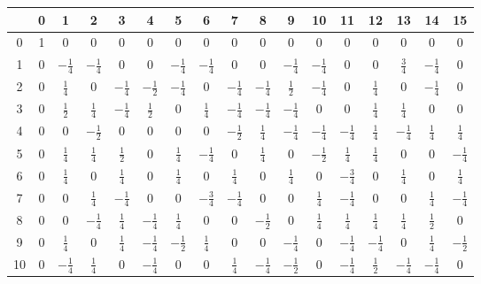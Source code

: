 \begin{refsegment}
\begin{table}
\begin{center}
\begin{tabular}{|c|cccccccccccccccc|} \hline
     & 0 & 1 & 2 & 3 & 4 & 5 & 6 & 7 & 8 & 9 &10 &11 &12 &13 &14 &15 \\ \hline
   0 & 1 & 0 & 0 & 0 & 0 & 0 & 0 & 0 & 0 & 0 & 0 & 0 & 0 & 0 & 0 & 0 \\
   1 & 0 &$-\frac{1}{4}$&$-\frac{1}{4}$& 0 & 0 &$-\frac{1}{4}$&$-\frac{1}{4}$& 0 & 0 &$-\frac{1}{4}$&$-\frac{1}{4}$& 0 & 0 &$\frac{3}{4}$&$-\frac{1}{4}$& 0 \\
   2 & 0 &$\frac{1}{4}$& 0 & $-\frac{1}{4}$ &$-\frac{1}{2}$& $-\frac{1}{4}$ & 0 & $-\frac{1}{4}$ & $-\frac{1}{4}$ &$\frac{1}{2}$& $-\frac{1}{4}$ & 0 &$\frac{1}{4}$& 0 & $-\frac{1}{4}$ & 0 \\
   3 & 0 &$\frac{1}{2}$&$\frac{1}{4}$& $-\frac{1}{4}$ &$\frac{1}{2}$& 0 &$\frac{1}{4}$& $-\frac{1}{4}$ & $-\frac{1}{4}$ & $-\frac{1}{4}$ & 0 & 0 &$\frac{1}{4}$&$\frac{1}{4}$& 0 & 0 \\
   4 & 0 & 0 &$-\frac{1}{2}$& 0 & 0 & 0 & 0 &$-\frac{1}{2}$&$\frac{1}{4}$& $-\frac{1}{4}$ & $-\frac{1}{4}$ & $-\frac{1}{4}$ &$\frac{1}{4}$& $-\frac{1}{4}$ &$\frac{1}{4}$&$\frac{1}{4}$\\
   5 & 0 &$\frac{1}{4}$&$\frac{1}{4}$&$\frac{1}{2}$& 0 &$\frac{1}{4}$& $-\frac{1}{4}$ & 0 &$\frac{1}{4}$& 0 &$-\frac{1}{2}$&$\frac{1}{4}$&$\frac{1}{4}$& 0 & 0 & $-\frac{1}{4}$ \\
   6 & 0 &$\frac{1}{4}$& 0 &$\frac{1}{4}$& 0 &$\frac{1}{4}$& 0 &$\frac{1}{4}$& 0 &$\frac{1}{4}$& 0 & $-\frac{3}{4}$ & 0 &$\frac{1}{4}$& 0 &$\frac{1}{4}$\\
   7 & 0 & 0 &$\frac{1}{4}$& $-\frac{1}{4}$ & 0 & 0 & $-\frac{3}{4}$ & $-\frac{1}{4}$ & 0 & 0 &$\frac{1}{4}$& $-\frac{1}{4}$ & 0 & 0 &$\frac{1}{4}$& $-\frac{1}{4}$ \\
   8 & 0 & 0 & $-\frac{1}{4}$ &$\frac{1}{4}$& $-\frac{1}{4}$ &$\frac{1}{4}$& 0 & 0 &$-\frac{1}{2}$& 0 &$\frac{1}{4}$&$\frac{1}{4}$&$\frac{1}{4}$&$\frac{1}{4}$&$\frac{1}{2}$& 0 \\
   9 & 0 &$\frac{1}{4}$& 0 &$\frac{1}{4}$& $-\frac{1}{4}$ &$-\frac{1}{2}$&$\frac{1}{4}$& 0 & 0 & $-\frac{1}{4}$ & 0 & $-\frac{1}{4}$ & $-\frac{1}{4}$ & 0 &$\frac{1}{4}$&$-\frac{1}{2}$\\
  10 & 0 & $-\frac{1}{4}$ &$\frac{1}{4}$& 0 & $-\frac{1}{4}$ & 0 & 0 &$\frac{1}{4}$& $-\frac{1}{4}$ &$-\frac{1}{2}$& 0 & $-\frac{1}{4}$ &$\frac{1}{2}$& $-\frac{1}{4}$ & $-\frac{1}{4}$ & 0 \\

\end{tabular}
\end{center}
\end{table}
\end{refsegment}
